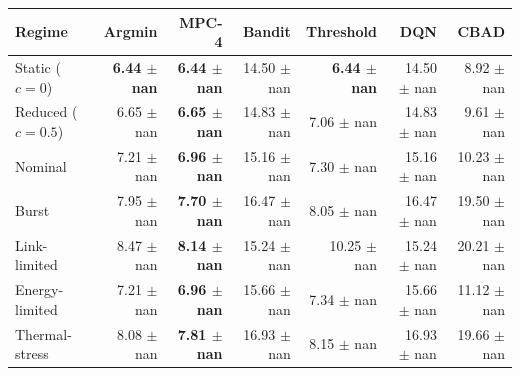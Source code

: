 \begin{tabular}{lrrrrrr}
\toprule
Regime & Argmin & MPC-4 & Bandit & Threshold & DQN & CBAD \\
\midrule
Static ($c=0$) & \textbf{6.44 $\pm$ nan} & \textbf{6.44 $\pm$ nan} & 14.50 $\pm$ nan & \textbf{6.44 $\pm$ nan} & 14.50 $\pm$ nan & 8.92 $\pm$ nan \\
Reduced ($c=0.5$) & 6.65 $\pm$ nan & \textbf{6.65 $\pm$ nan} & 14.83 $\pm$ nan & 7.06 $\pm$ nan & 14.83 $\pm$ nan & 9.61 $\pm$ nan \\
Nominal & 7.21 $\pm$ nan & \textbf{6.96 $\pm$ nan} & 15.16 $\pm$ nan & 7.30 $\pm$ nan & 15.16 $\pm$ nan & 10.23 $\pm$ nan \\
Burst & 7.95 $\pm$ nan & \textbf{7.70 $\pm$ nan} & 16.47 $\pm$ nan & 8.05 $\pm$ nan & 16.47 $\pm$ nan & 19.50 $\pm$ nan \\
Link-limited & 8.47 $\pm$ nan & \textbf{8.14 $\pm$ nan} & 15.24 $\pm$ nan & 10.25 $\pm$ nan & 15.24 $\pm$ nan & 20.21 $\pm$ nan \\
Energy-limited & 7.21 $\pm$ nan & \textbf{6.96 $\pm$ nan} & 15.66 $\pm$ nan & 7.34 $\pm$ nan & 15.66 $\pm$ nan & 11.12 $\pm$ nan \\
Thermal-stress & 8.08 $\pm$ nan & \textbf{7.81 $\pm$ nan} & 16.93 $\pm$ nan & 8.15 $\pm$ nan & 16.93 $\pm$ nan & 19.66 $\pm$ nan \\
\bottomrule
\end{tabular}
